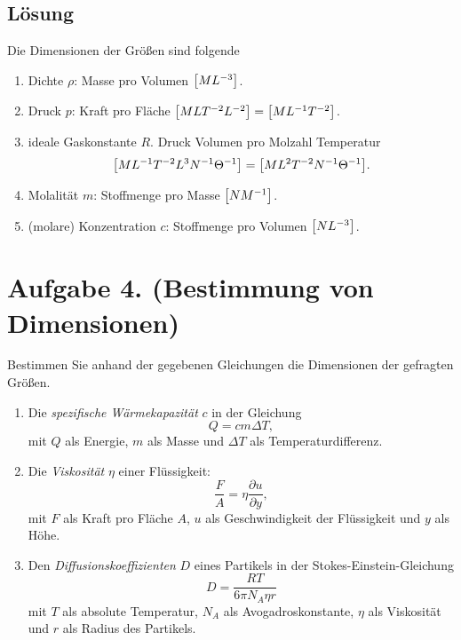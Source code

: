 \documentclass[german,12pt]{homework}
\DeclarePairedDelimiter{\benbrace}{[}{]}
\begin{document}
    \subsection*{Lösung}
    Die Dimensionen der Größen sind folgende
    \begin{enumerate}
        \item Dichte \(\rho\): Masse pro Volumen \(\benbrace*{ML^{-3}}\).
        \item Druck \(p\): Kraft pro Fläche \(\benbrace*{MLT^{-2}L^{-2}} =
        \benbrace*{ML^{-1}T^{-2}}\).
        \item ideale Gaskonstante \(R\). Druck Volumen pro Molzahl Temperatur
        \[\benbrace*{ML^{-1}T^{-2}L^3N^{-1}\Theta^{-1}} = \benbrace*{ML^2T^{-2}
        N^{-1}\Theta^{-1}}.\]
        \item Molalität \(m\): Stoffmenge pro Masse \(\benbrace*{NM^{-1}}\).
        \item (molare) Konzentration \(c\): Stoffmenge pro Volumen
        \(\benbrace*{NL^{-3}}\).
    \end{enumerate}

    \section*{Aufgabe 4. (Bestimmung von Dimensionen)}

    \begin{problem}
        Bestimmen Sie anhand der gegebenen Gleichungen die Dimensionen der
        gefragten Größen.
        \begin{enumerate}
            \item Die \emph{spezifische Wärmekapazität} \(c\) in der Gleichung
            \[Q = cm{\Delta}T,\]
            mit \(Q\) als Energie, \(m\) als Masse und \(\Delta{T}\) als
            Temperaturdifferenz.
            \item Die \emph{Viskosität} \(\eta\) einer Flüssigkeit:
            \[\frac{F}{A} = \eta\frac{\partial{u}}{\partial{y}},\]
            mit \(F\) als Kraft pro Fläche \(A\), \(u\) als Geschwindigkeit der
            Flüssigkeit und \(y\) als Höhe.
            \item Den \emph{Diffusionskoeffizienten} \(D\) eines Partikels in
            der Stokes-Einstein-Gleichung
            \[D = \frac{RT}{6\pi{N_A}\eta{r}}\]
            mit \(T\) als absolute Temperatur, \(N_A\) als Avogadroskonstante,
            \(\eta\) als Viskosität und \(r\) als Radius des Partikels.
        \end{enumerate}
    \end{problem}
\end{document}
